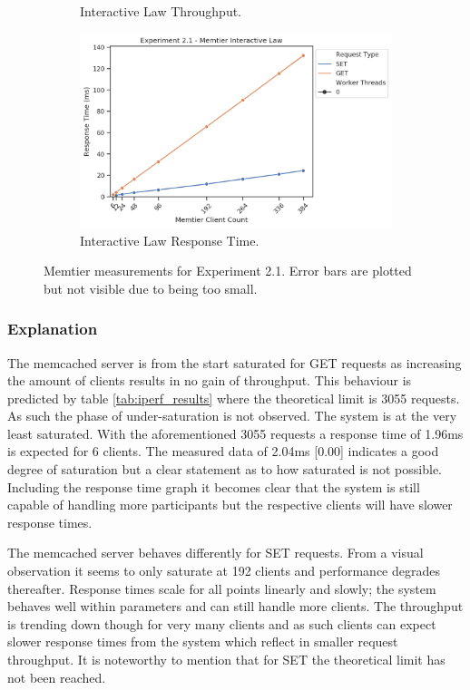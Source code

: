 \begin{figure}
\begin{subfigure}[t!]{0.45\textwidth}
                \caption{Interactive Law \textendash{} Throughput.\label{fig:21_mt_tp_il}}
                \includegraphics[width=\textwidth]{../data_analysis/figures/2-1_mt_response-time-il.png}
                \caption{Interactive Law \textendash{} Response Time.\label{fig:21_mt_rt_il}}
            \end{subfigure}
            \caption{Memtier measurements for Experiment 2.1. Error bars are plotted but not visible due to being too
                     small.}
            \label{fig:21_all}
        \end{figure}

        \subsubsection{Explanation}

            The memcached server is from the start saturated for GET requests as increasing the amount of
            clients results in no gain of throughput. This behaviour is predicted by table \ref{tab:iperf_results}
            where the theoretical limit is 3055 requests. As such the phase of under-saturation is not observed. The
            system is at the very least saturated.  With the aforementioned 3055 requests a response time of 1.96ms
            is expected for 6 clients. The measured data of 2.04ms [0.00] indicates a good degree of saturation but
            a clear statement as to how saturated is not possible. Including the response time graph it becomes
            clear that the system is still capable of handling more participants but the respective clients will
            have slower response times.

            The memcached server behaves differently for SET requests. From a visual observation it seems to only
            saturate at 192 clients and performance degrades thereafter. Response times scale for all points
            linearly and slowly; the system behaves well within parameters and can still handle more clients. The
            throughput is trending down though for very many clients and as such clients can expect slower response
            times from the system which reflect in smaller request throughput. It is noteworthy to mention that
            for SET the theoretical limit has not been reached.

